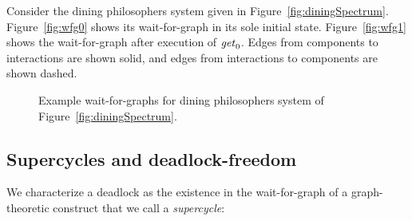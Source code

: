 
Consider the dining philosophers system given in Figure~\ref{fig:diningSpectrum}.  Figure~\ref{fig:wfg0} shows its
wait-for-graph in its sole initial state.  Figure~\ref{fig:wfg1} shows the wait-for-graph after execution of $\mathit{get}_0$.
Edges from components to interactions are shown solid, and edges from interactions to components are shown dashed.

\begin{figure*}[ht]
  \begin{center}
       \quad
      \caption{Example wait-for-graphs for dining philosophers system of Figure~\ref{fig:diningSpectrum}.}
       \label{fig:wfg}
  \end{center}
\end{figure*}





\subsection{Supercycles and deadlock-freedom}

We characterize a deadlock as the existence in the wait-for-graph of a
graph-theoretic construct that we call a {\em supercycle}:

